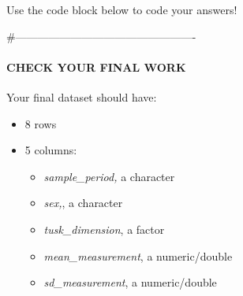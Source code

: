 \documentclass[
]{article}
\providecommand{\tightlist}{%
  \setlength{\itemsep}{0pt}\setlength{\parskip}{0pt}}
\begin{document}
Use the code block below to code your answers!

\#-------------------------------------------------

\paragraph{\texorpdfstring{\textbf{CHECK YOUR FINAL
WORK}}{CHECK YOUR FINAL WORK}}\label{check-your-final-work}

Your final dataset should have:

\begin{itemize}
\tightlist
\item
  8 rows
\item
  5 columns:

  \begin{itemize}
  \tightlist
  \item
    \emph{sample\_period,} a character
  \item
    \emph{sex,}, a character
  \item
    \emph{tusk\_dimension}, a factor
  \item
    \emph{mean\_measurement}, a numeric/double
  \item
    \emph{sd\_measurement}, a numeric/double
  \end{itemize}
\end{itemize}
\end{document}

